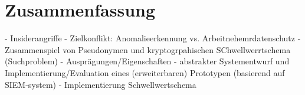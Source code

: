 \chapter*{Zusammenfassung}


- Insiderangriffe
- Zielkonflikt: Anomalieerkennung vs. Arbeitnehemrdatenschutz
- Zusammenspiel von Pseudonymen und kryptogrpahischen SChwellwerrtschema (Suchproblem)
- Ausprägungen/Eigenschaften
- abstrakter Systementwurf und Implementierung/Evaluation eines (erweiterbaren) Prototypen (basierend auf SIEM-system)
- Implementierung Schwellwertschema